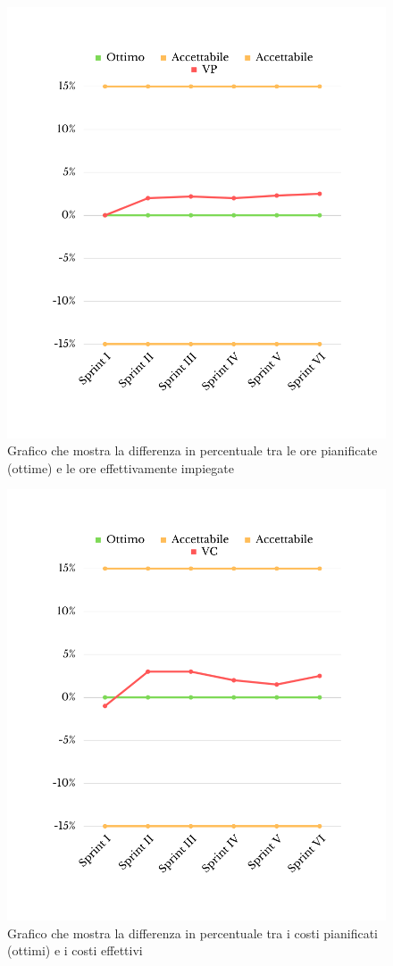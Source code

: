 \begin{figure}[H]
	\centering
	\includegraphics[scale=0.5]{img/SV.png}
	\caption{Grafico che mostra la differenza in percentuale tra le ore pianificate (ottime) e le ore effettivamente impiegate}
\end{figure}
\begin{figure}[H]
	\centering
	\includegraphics[scale=0.5]{img/CV.png}
	\caption{Grafico che mostra la differenza in percentuale tra i costi pianificati (ottimi) e i costi effettivi}
\end{figure}
